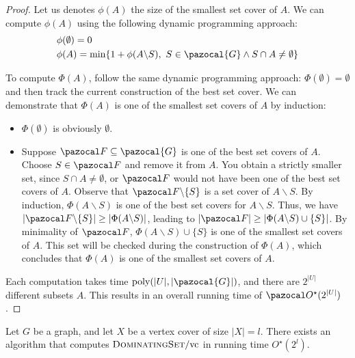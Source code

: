 \begin{proof}
    Let us denotes $\phi(A)$ the size of the smallest set cover of $A$. We can compute $\phi(A)$ using the following dynamic programming approach:
    \begin{align*}
        &\phi(\emptyset) = 0\\
        &\phi(A) = \min\{1 + \phi(A \backslash S),\ S \in \pazocal{G} \land S \cap A \neq \emptyset\}
    \end{align*}
    
    To compute $\Phi(A)$, follow the same dynamic programming approach: $\Phi(\emptyset) = \emptyset$ and then track the current construction of the best set cover. We can demonstrate that $\Phi(A)$ is one of the smallest set covers of $A$ by induction:
    \begin{itemize}
        \item $\Phi(\emptyset)$ is obviously $\emptyset$.
        \item Suppose $\F \subseteq \pazocal{G}$ is one of the best set covers of $A$. Choose $S \in \F$ and remove it from $A$. You obtain a strictly smaller set, since $S \cap A \neq \emptyset$, or $\F$ would not have been one of the best set covers of $A$. Observe that $\F \backslash \{S\}$ is a set cover of $A \backslash S$. By induction, $\Phi(A \backslash S)$ is one of the best set covers for $A \backslash S$. Thus, we have $|\F \backslash \{S\}| \geq |\Phi(A \backslash S)|$, leading to $|\F| \geq |\Phi(A \backslash S) \cup \{S\}|$. By minimality of $\F$, $\Phi(A \backslash S) \cup \{S\}$ is one of the smallest set covers of $A$. This set will be checked during the construction of $\Phi(A)$, which concludes that $\Phi(A)$ is one of the smallest set covers of $A$.
    \end{itemize}
    
    Each computation takes time $\poly(|U|, |\pazocal{G}|)$, and there are $2^{|U|}$ different subsets $A$. This results in an overall running time of $\O^\star(2^{|U|})$.
\end{proof}



\begin{theorem}
    Let $G$ be a graph, and let $X$ be a vertex cover of size $|X| = l$. There exists an algorithm that computes $\textsc{DominatingSet}/\text{vc}$ in running time $O^\star(2^l)$.
\end{theorem}

